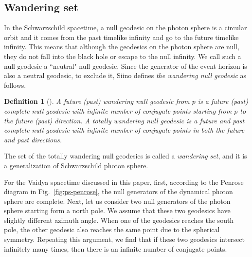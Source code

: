 \documentclass[prd,showpacs,preprintnumbers,groupedaddress,superscriptaddress,nofootinbib,11pt]{revtex4-1} %
\theoremstyle{newplain}
\newtheorem{definition}{Definition}
\begin{document}
\subsection{Wandering set}
In the Schwarzschild spacetime,
a null geodesic on the photon sphere is a circular orbit and it comes from the past timelike infinity and go to the future timelike infinity.
This means that although the geodesics on the photon sphere are null, they do not fall into the black hole or escape to the null infinity.
We call such a null geodesic a ``neutral" null geodesic.
Since the generator of the event horizon is also a neutral geodesic,
to exclude it, Siino defines {\it the wandering null geodesic} as follows.
\begin{definition}[\cite{siino_2019,siino_2021}]
A future (past) wandering null geodesic from $p$ is a future (past) complete null geodesic
with infinite number of conjugate points starting from $p$ to the future (past) direction.
A totally wandering null geodesic is a future and past complete null geodesic
with infinite number of conjugate points in both the future and past directions.
\label{wandering_geodesic}
\end{definition}
\noindent
The set of the totally wandering null geodesics is called a {\itshape wandering set}, and it is a generalization of Schwarzschild photon sphere.




For the Vaidya spacetime discussed in this paper, first, according to the Penrose diagram in Fig.~\ref{fig:ps-penrose}, the null generators of the dynamical photon sphere are complete.
Next, let us consider two null generators of the photon sphere starting form a north pole.
We assume that these two geodesics have slightly different azimuth angle.
When one of the geodesics reaches the south pole, the other geodesic also reaches the same point due to the spherical symmetry.
Repeating this argument, we find that 
if these two geodesics intersect infinitely many times, then
there is an infinite number of conjugate points.
\end{document}
